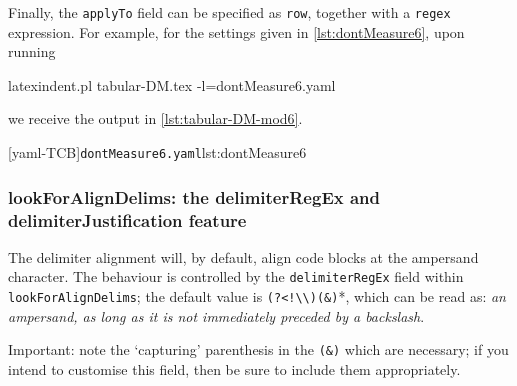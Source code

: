  \begin{example}
 Finally, the \texttt{applyTo} field can be specified as \texttt{row}, together with a
 \texttt{regex} expression. For example, for the settings given in
 \cref{lst:dontMeasure6}, upon running 

 \begin{commandshell} 
latexindent.pl tabular-DM.tex -l=dontMeasure6.yaml
\end{commandshell}

 we receive the output in \cref{lst:tabular-DM-mod6}.  

 \begin{cmhtcbraster}
  [yaml-TCB]{\texttt{dontMeasure6.yaml}}{lst:dontMeasure6}
 \end{cmhtcbraster}
 \end{example}

\subsubsection{lookForAlignDelims: the delimiterRegEx and delimiterJustification feature}\label{sec:delimiter-reg-ex}

 The delimiter alignment  will, by default,
 align code blocks at the ampersand character. The behaviour is controlled by the
 \texttt{delimiterRegEx} field within \texttt{lookForAlignDelims}; the default value is
 \lstinline*'(?<!\\)(&)'*, which can be read as: \emph{an ampersand, as long as it is not
 immediately preceded by a backslash}.    

 \begin{warning}
  Important: note the `capturing' parenthesis in the \lstinline!(&)! which are necessary;
  if you intend to customise this field, then be sure to include them appropriately.
 \end{warning}

